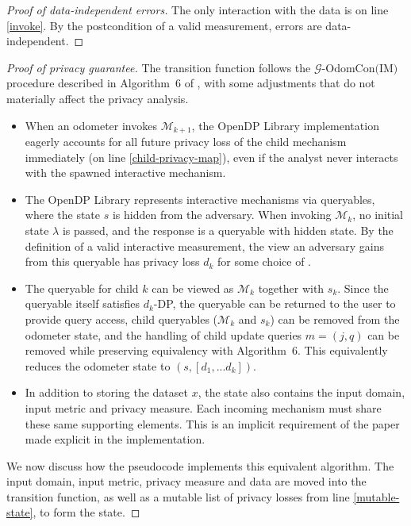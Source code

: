 \documentclass{article}
\begin{document}
\begin{proof}[Proof of data-independent errors]
    The only interaction with the data is on line \ref{invoke}.
    By the postcondition of a valid measurement,
    errors are data-independent.
\end{proof}

\begin{proof}[Proof of privacy guarantee]
    The transition function follows the $\mathcal{G}\text{-OdomCon(IM)}$ procedure described in Algorithm~6 of \cite{haney2023concurrentcompositioninteractivedifferential},
    with some adjustments that do not materially affect the privacy analysis.

    \begin{itemize}
        \item When an odometer invokes $\mathcal{M}_{k+1}$, 
        the OpenDP Library implementation eagerly accounts for all future privacy loss of the child mechanism immediately (on line \ref{child-privacy-map}),
        even if the analyst never interacts with the spawned interactive mechanism.
        \item The OpenDP Library represents interactive mechanisms via queryables,
        where the state $s$ is hidden from the adversary. When invoking $\mathcal{M}_k$,
        no initial state $\lambda$ is passed, and the response is a queryable with hidden state.
        By the definition of a valid interactive measurement, the view an adversary gains from this queryable has privacy loss $d_k$
        for some choice of \din.
        \item The queryable for child $k$ can be viewed as $\mathcal{M}_k$ together with $s_k$.
        Since the queryable itself satisfies $d_k$-DP, the queryable can be returned to the user to provide query access, 
        child queryables ($\mathcal{M}_k$ and $s_k$) can be removed from the odometer state,
        and the handling of child update queries $m = (j, q)$ can be removed while preserving equivalency with Algorithm~6.
        This equivalently reduces the odometer state to $(s, [d_1, ... d_k])$.
        \item In addition to storing the dataset $x$, 
        the state also contains the input domain, input metric and privacy measure.
        Each incoming mechanism must share these same supporting elements.
        This is an implicit requirement of the paper made explicit in the implementation.
    \end{itemize}

    We now discuss how the pseudocode implements this equivalent algorithm.
    The input domain, input metric, privacy measure and data are moved into the transition function,
    as well as a mutable list of privacy losses from line \ref{mutable-state},
    to form the state.


\end{proof}
\end{document}
